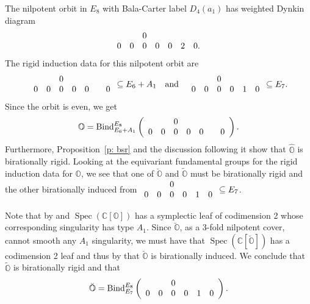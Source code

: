 \documentclass[11pt]{amsart}
\newcommand{\C}{{\mathbb C}}
\renewcommand{\O}{{\mathbb O}}
\newcommand{\Spec}{\operatorname{Spec}}
\newcommand{\BInd}{{{\mbox{\rm Bind}}}}
\newcommand{\covO}{\widetilde{\O}}
\newcommand{\hatO}{\widehat{\O}}
\newcommand{\breveO}{\breve{\O}}
\numberwithin{equation}{section}
\begin{document}
	The nilpotent orbit in $E_8$ with Bala-Carter label $D_4(a_1)$ has weighted Dynkin diagram 
	$$\begin{array}{c c c c c c c}
		& & 0 & & & &  \\
		0 & 0 & 0 & 0 & 0 & 2 & 0. \\
	\end{array}$$
	The rigid induction data for this nilpotent orbit are $$ \begin{array}{c c c c c c c}
		& & 0 & & & &  \\
		0 & 0 & 0 & 0 & 0 & & 0 \\
	\end{array}\subseteq E_6+A_1\quad\mbox{and}\quad \begin{array}{c c c c c c}
		& & 0 & & &  \\
		0 & 0 & 0 & 0 & 1 & 0  \\
	\end{array}\subseteq E_7. $$
	Since the orbit is even, we get $$\O=\BInd_{E_6 + A_1}^{E_8}\left(\begin{array}{c c c c c c c}
		& & 0 & & & & \\
		0 & 0 & 0 & 0 & 0 & & 0\\
	\end{array}\right).$$ Furthermore, Proposition~\ref{p: bsr} and the discussion following it show that $\hatO$ is birationally rigid. Looking at the equivariant fundamental groups for the rigid induction data for $\O$, we see that one of $\breveO$ and $\covO$ must be birationally rigid and the other birationally induced from $\begin{array}{c c c c c c}
		& & 0 &  & &\\
		0 & 0 & 0 & 0 & 1 & 0 \\
	\end{array}\subseteq E_7$. 
	
	Note that by \cite{FJLS} and \cite[Lemma 3.2.2]{MM} $\Spec(\C[\O])$ has a symplectic leaf of codimension 2 whose corresponding singularity has type $A_1$. Since $\breveO$, as a 3-fold nilpotent cover, cannot smooth any $A_1$ singularity, we must have that $\Spec(\C[\breveO])$ has a codimension 2 leaf and thus by \cite[Corollary 7.6.1]{LMM} that $\breveO$ is birationally induced. We conclude that $\covO$ is birationally rigid and that
	$$\breveO=\BInd_{E_7}^{E_8}\left( \begin{array}{c c c c c c}
		& & 0 &  & &\\
		0 & 0 & 0 & 0 & 1 & 0\\
	\end{array} \right).$$ 
	
\end{document}
